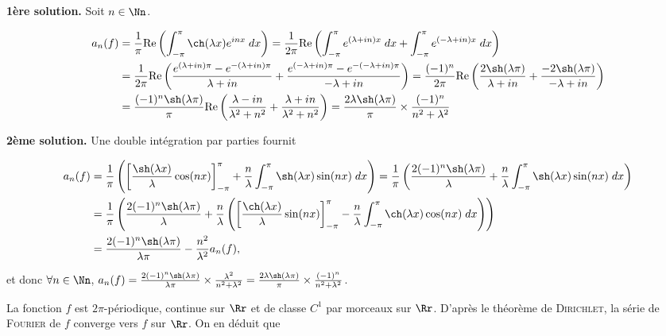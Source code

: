 {{\textbf{1ère solution.} Soit $n\in\Nn$.

\begin{align*}\ensuremath
a_n(f)&=\frac{1}{\pi}\text{Re}\left(\int_{-\pi}^{\pi}\ch(\lambda x)e^{inx}\;dx\right)=\frac{1}{2\pi}\text{Re}\left(\int_{-\pi}^{\pi}e^{(\lambda+in)x}\;dx+\int_{-\pi}^{\pi}e^{(-\lambda+in)x}\;dx\right)\\
 &=\frac{1}{2\pi}\text{Re}\left(\frac{e^{(\lambda+in)\pi}-e^{-(\lambda+in)\pi}}{\lambda+in}+\frac{e^{(-\lambda+in)\pi}-e^{-(-\lambda+in)\pi}}{-\lambda+in}\right)=\frac{(-1)^n}{2\pi}\text{Re}\left(\frac{2\sh(\lambda\pi)}{\lambda+in}+\frac{-2\sh(\lambda\pi)}{-\lambda+in}\right)\\
 &=\frac{(-1)^n\sh(\lambda\pi)}{\pi}\text{Re}\left(\frac{\lambda-in}{\lambda^2+n^2}+\frac{\lambda+in}{\lambda^2+n^2}\right)=\frac{2\lambda\sh(\lambda\pi)}{\pi}\times\frac{(-1)^n}{n^2+\lambda^2}
\end{align*}

\textbf{2ème solution.} Une double intégration par parties fournit

\begin{align*}\ensuremath
a_n(f)&=\frac{1}{\pi}\left(\left[\frac{\sh(\lambda x)}{\lambda}\cos(nx)\right]_{-\pi}^{\pi}+\frac{n}{\lambda}\int_{-\pi}^{\pi}\sh(\lambda x)\sin(nx)\;dx\right)=\frac{1}{\pi}\left(\frac{2(-1)^n\sh(\lambda\pi)}{\lambda}+\frac{n}{\lambda}\int_{-\pi}^{\pi}\sh(\lambda x)\sin(nx)\;dx\right)\\
 &=\frac{1}{\pi}\left(\frac{2(-1)^n\sh(\lambda\pi)}{\lambda}+\frac{n}{\lambda}\left(\left[\frac{\ch(\lambda x)}{\lambda}\sin(nx)\right]_{-\pi}^{\pi}-\frac{n}{\lambda}\int_{-\pi}^{\pi}\ch(\lambda x)\cos(nx)\;dx\right)\right)\\
 &=\frac{2(-1)^n\sh(\lambda\pi)}{\lambda\pi}-\frac{n^2}{\lambda^2}a_n(f),
\end{align*}

et donc $\forall n\in\Nn$, $a_n(f)=\frac{2(-1)^n\sh(\lambda\pi)}{\lambda\pi}\times\frac{\lambda^2}{n^2+\lambda^2}=\frac{2\lambda\sh(\lambda\pi)}{\pi}\times\frac{(-1)^n}{n^2+\lambda^2}$.

La fonction $f$ est $2\pi$-périodique, continue sur $\Rr$ et de classe $C^1$ par morceaux sur $\Rr$. D'après le théorème de \textsc{Dirichlet}, la série de \textsc{Fourier} de $f$ converge vers $f$ sur $\Rr$. On en déduit que

\begin{center}
\end{center}

}}
